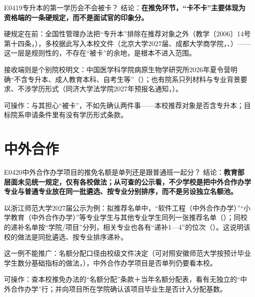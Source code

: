 \begin{qa}{E0419}{专升本的第一学历会不会被卡？}
结论：\textbf{在推免环节，“卡不卡”主要体现为资格端的一条硬规定，而不是面试官的印象分。}

硬规定在前：全国性管理办法把“专升本”排除在推荐对象之外（教学〔2006〕14号第十四条，），多校据此写入本校文件（北京大学2027届、成都大学商学院，、）——这一层是规则性的，不存在“被卡”的余地，是根本不进入范围。

接收端则是个别院校明文：中国医学科学院病原生物学研究所2026年夏令营明确“不含专升本、成人教育本科、自考生等”（）；也有院系只列材料与专业背景要求、不涉学历形式（同济大学法学院2027年预报名通知，）。

可操作：与其担心“被卡”，不如先确认两件事——本校推荐对象是否含专升本；目标院系申请条件里有没有学历形式条款。
\end{qa}

\section{中外合作}
\begin{qa}{E0420}{中外合作办学项目的推免名额是单列还是跟普通班一起分？}
结论：\textbf{教育部层面未见统一规定，仅有各校做法；从可查的公示看，不少学校是把中外合作办学专业与普通专业放在同一批遴选、按专业分别排序，而不是另设独立名额池。}

以浙江师范大学2027届公示为例：拟推荐名单中，“软件工程（中外合作办学）”“小学教育（中外合作办学）”等专业学生与其他专业学生同列一张推荐名单（）；同校的递补名单按“学院/项目”分列，相关专业也各有“递补1—4”的位次（）。这说明该校的做法是同批遴选、按专业排序递补。

这一例不能推广：名额分配口径由校级文件决定（可对照安徽师范大学按预计毕业学生数分基础指标的做法，），中外合作办学项目是否单列仍要看本校。

可操作：查本校推免办法的“名额分配”条款＋当年名额分配表，看有无独立的“中外合作办学”行；并向项目所在学院确认该项目毕业生是否计入分配基数。
\end{qa}

